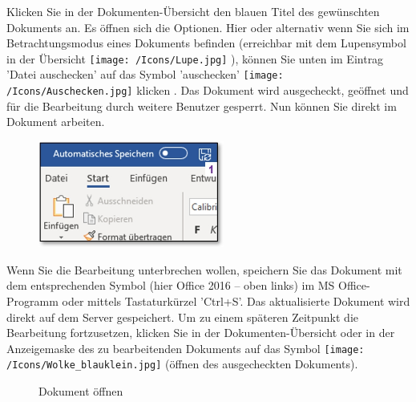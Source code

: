 Klicken Sie in der Dokumenten-Übersicht den blauen Titel des gewünschten Dokuments  an. Es öffnen sich die Optionen. Hier oder alternativ wenn Sie sich im Betrachtungsmodus eines Dokuments befinden (erreichbar mit dem Lupensymbol in der Übersicht \texttt{[image: /Icons/Lupe.jpg]} ), können Sie unten im Eintrag 'Datei auschecken'  auf das Symbol 'auschecken' \texttt{[image: /Icons/Auschecken.jpg]} klicken . Das Dokument wird ausgecheckt, geöffnet und für die Bearbeitung durch weitere Benutzer gesperrt. Nun können Sie direkt im Dokument arbeiten. 

\vspace{\baselineskip}

\begin{figure}
\vspace{-5pt}
\includegraphics[height=35mm]{../chapters/11_Dokumentenablage/pictures/11-2-7_WordSpeichern.jpg}
\end{figure}
Wenn Sie die Bearbeitung unterbrechen wollen, speichern Sie das Dokument mit dem entsprechenden Symbol  (hier Office 2016 -- oben links) im MS Office-Programm oder mittels Tastaturkürzel 'Ctrl+S'. Das aktualisierte Dokument wird direkt auf dem Server gespeichert. Um zu einem späteren Zeitpunkt die Bearbeitung fortzusetzen, klicken Sie in der Dokumenten-Übersicht oder in der Anzeigemaske des zu bearbeitenden Dokuments auf das Symbol \texttt{[image: /Icons/Wolke\_blauklein.jpg]}  (öffnen des ausgecheckten Dokuments).

\begin{figure}[H]
\caption{Dokument öffnen}
\end{figure}

